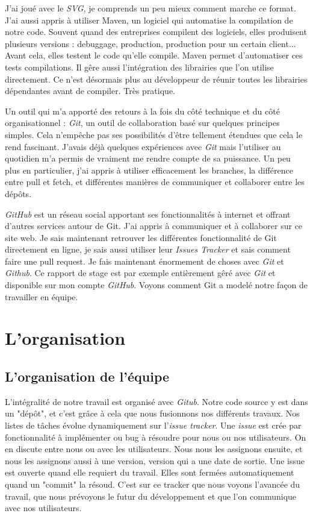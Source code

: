 J'ai joué avec le \textit{SVG}, je comprends un peu mieux comment marche ce format. J'ai aussi appris à utiliser Maven, un logiciel qui automatise la compilation de notre code. Souvent quand des entreprises compilent des logiciels, elles produisent plusieurs versions : debuggage, production, production pour un certain client... Avant cela, elles testent le code qu'elle compile. Maven permet d'automatiser ces tests compilations. Il gêre aussi l'intégration des librairies que l'on utilise directement. Ce n'est désormais plus au développeur de réunir toutes les librairies dépendantes avant de compiler. Très pratique. 

Un outil qui m'a apporté des retours à la fois du côté technique et du côté organisationnel : \textit{Git}, un outil de collaboration  basé sur quelques principes simples. Cela n'empêche pas ses possibilités d'être tellement étendues que cela le rend fascinant. J'avais déjà quelques expériences avec \textit{Git} mais l'utiliser au quotidien m'a permis de vraiment me rendre compte de sa puissance. Un peu plus en particulier, j'ai appris à utiliser efficacement les branches, la différence entre pull et fetch, et différentes manières de communiquer et collaborer entre les dépôts.

\textit{GitHub} est un réseau social apportant ses fonctionnalités à internet et offrant d'autres services autour de Git. J'ai appris à communiquer et à collaborer sur ce site web. Je sais maintenant retrouver les différentes fonctionnalité de Git directement en ligne, je sais aussi utiliser leur \textit{Issues Tracker} et sais comment faire une pull request. Je fais maintenant énormement de choses avec \textit{Git} et \textit{Github}. Ce rapport de stage est par exemple entièrement gêré avec \textit{Git} et disponible sur mon compte \textit{GitHub}.
Voyons comment Git a modelé notre façon de travailler en équipe.


\section{L'organisation}

\subsection{L'organisation de l'équipe}
L'intégralité de notre travail est organisé avec \textit{Gitub}. Notre code source y est dans un "dépôt", et c'est grâce à cela que nous fusionnons nos différents travaux. Nos listes de tâches évolue dynamiquement sur l'\textit{issue tracker}. Une \textit{issue} est crée par fonctionnalité à implémenter ou bug à résoudre pour nous ou nos utilisateurs. On en discute entre nous ou avec les utilisateurs. Nous nous les assignons ensuite, et nous les assignons aussi à une version, version qui a une date de sortie. Une issue est ouverte quand elle requiert du travail. Elles sont fermées automatiquement quand un "commit" la résoud. C'est sur ce tracker que nous voyons l'avancée du travail, que nous prévoyons le futur du développement et que l'on communique avec nos utilisateurs.

